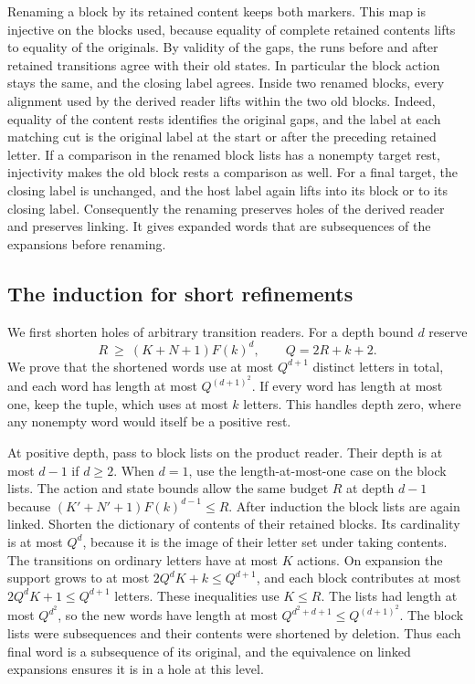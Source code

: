 Renaming a block by its retained content keeps both markers. This
map is injective on the blocks used, because equality of complete
retained contents lifts to equality of the originals. By validity
of the gaps, the runs before and after retained transitions agree
with their old states. In particular the block action stays the
same, and the closing label agrees. Inside two renamed blocks,
every alignment used by the derived reader lifts within the two
old blocks. Indeed, equality of the content rests identifies
the original gaps, and the label at each matching cut is the
original label at the start or after the preceding retained letter.
If a comparison in the renamed block lists has a nonempty target
rest, injectivity makes the old block rests a comparison as well.
For a final target, the closing label is unchanged, and the host
label again lifts into its block or to its closing label. Consequently
the renaming preserves holes of the derived reader and preserves
linking. It gives expanded words that are subsequences of the
expansions before renaming.

\subsection{The induction for short refinements}

We first shorten holes of arbitrary transition readers. For a depth
bound $d$ reserve
\[
 R\ \ge\ (K+N+1)F(k)^d,\qquad Q=2R+k+2 .
\]
We prove that the shortened words use at most $Q^{d+1}$ distinct
letters in total, and each word has length at most $Q^{(d+1)^2}$.
If every word has length at most one, keep the tuple, which uses
at most $k$ letters. This handles depth zero, where any nonempty
word would itself be a positive rest.

At positive depth, pass to block lists on the product reader.
Their depth is at most $d-1$ if $d\ge 2$. When $d=1$, use the
length-at-most-one case on the block lists. The action and state
bounds allow the same budget $R$ at depth $d-1$ because
$(K'+N'+1)F(k)^{d-1}\le R$. After induction the block lists are
again linked. Shorten the dictionary of contents of their retained
blocks. Its cardinality is at most $Q^d$, because it is the
image of their letter set under taking contents. The transitions
on ordinary letters have at most $K$ actions. On expansion
the support grows to at most $2Q^d K+k\le Q^{d+1}$, and each
block contributes at most $2Q^d K+1\le Q^{d+1}$ letters. These
inequalities use $K\le R$. The lists had length at most
$Q^{d^2}$, so the new words have length at most
$Q^{d^2+d+1}\le Q^{(d+1)^2}$. The block lists were subsequences and
their contents were shortened by deletion. Thus each final word
is a subsequence of its original, and the equivalence on linked
expansions ensures it is in a hole at this level.


